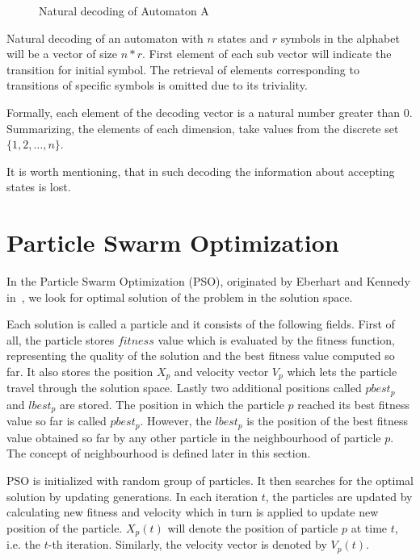 \documentclass{mini}
\begin{document}
\begin{figure}[H]
\begin{center}
        \caption{Natural decoding of Automaton A}
        \label{fig:encoding}
    \end{center}
\end{figure}

Natural decoding of an automaton with $n$ states and $r$ symbols in the alphabet will be a vector of size $n*r$. First element of each sub vector will indicate the transition for initial symbol. The retrieval of elements corresponding to transitions of specific symbols is omitted due to its triviality.

Formally, each element of the decoding vector is a natural number greater than 0. Summarizing, the elements of each dimension, take values from the discrete set $\{1,2, \ldots, n\}$.

It is worth mentioning, that in such decoding the information about accepting states is lost.





\chapter{Particle Swarm Optimization}
In the Particle Swarm Optimization (PSO), originated by Eberhart and Kennedy in~\cite{pso_origin}, we look for optimal solution of the problem in the solution space. 

Each solution is called a particle and it consists of the following fields. First of all, the particle stores $fitness$ value which is evaluated by the fitness function, representing the quality of the solution and the best fitness value computed so far. It also stores the position $X_p$ and velocity vector $V_p$ which lets the particle travel through the solution space. Lastly two additional positions called $pbest_p$ and $lbest_p$ are stored. The position in which the particle $p$ reached its best fitness value so far is called $pbest_p$. However, the $lbest_p$ is the position of the best fitness value obtained so far by any other particle in the neighbourhood of particle $p$. The concept of neighbourhood is defined later in this section.

PSO is initialized with random group of particles. It then searches for the optimal solution by updating generations.
In each iteration $t$, the particles are updated by calculating new fitness and velocity which in turn is applied to update new position of the particle. $X_p(t)$ will denote the position of particle $p$ at time $t$, i.e. the $t$-th iteration. Similarly, the velocity vector is denoted by $V_p(t)$.
\end{document}
